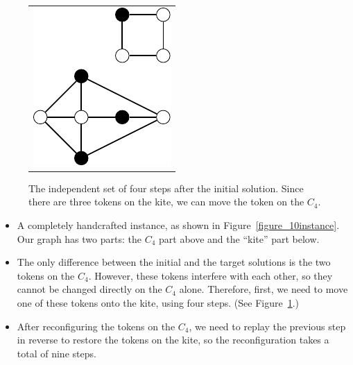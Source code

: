 \documentclass{article}
\begin{document}
	\begin{figure}[t]
		\begin{tabular}{c}
			\begin{minipage}[t]{1.0\hsize}
				\centering
				\includegraphics{10_m.pdf}
			\end{minipage}
		\end{tabular}
		\caption{The independent set of four steps after the initial solution. Since there are three tokens on the kite, we can move the token on the $C_4$.}
		\label{figure_10mid}
	\end{figure}
	\begin{itemize}
	\item A completely handcrafted instance, as shown in Figure~\ref{figure_10instance}. Our graph has two parts: the $C_4$ part above and the ``kite'' part below.
	\item The only difference between the initial and the target solutions is the two tokens on the $C_4$. However, these tokens interfere with each other, so they cannot be changed directly on the $C_4$ alone. Therefore, first, we need to move one of these tokens onto the kite, using four steps. (See Figure~\ref{figure_10mid}.)
	\item After reconfiguring the tokens on the $C_4$, we need to replay the previous step in reverse to restore the tokens on the kite, so the reconfiguration takes a total of nine steps.
	\end{itemize}
\end{document}
